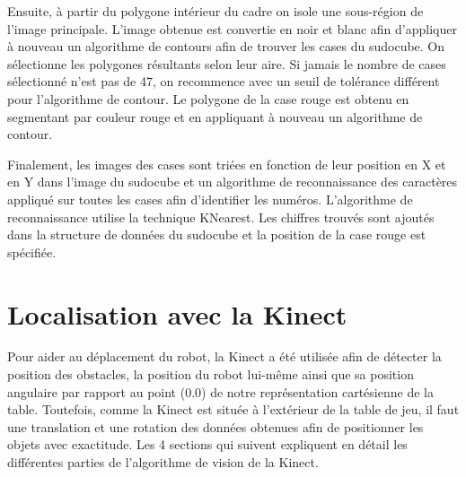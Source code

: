 Ensuite, à partir du polygone intérieur du cadre on isole une sous-région de l'image principale. L'image obtenue est convertie en noir et blanc afin d'appliquer à nouveau un algorithme de contours afin de trouver les cases du sudocube. On sélectionne les polygones résultants selon leur aire. Si jamais le nombre de cases sélectionné n'est pas de 47, on recommence avec un seuil de tolérance différent pour l'algorithme de contour. Le polygone de la case rouge est obtenu en segmentant par couleur rouge et en appliquant à nouveau un algorithme de contour. 

Finalement, les images des cases sont triées en fonction de leur position en X et en Y dans l'image du sudocube et un algorithme de reconnaissance des caractères appliqué sur toutes les cases afin d'identifier les numéros. L'algorithme de reconnaissance utilise la technique KNearest. Les chiffres trouvés sont ajoutés dans la structure de données du sudocube et la position de la case rouge est spécifiée.

\section{Localisation avec la Kinect}

Pour aider au déplacement du robot, la Kinect a été utilisée afin de détecter la position des obstacles, la position du robot lui-même ainsi que sa position angulaire par rapport au point (0.0) de notre représentation cartésienne de la table. Toutefois, comme la Kinect est située à l'extérieur de la table de jeu, il faut une translation et une rotation des données obtenues afin de positionner les objets avec exactitude. Les 4 sections qui suivent expliquent en détail les différentes parties de l'algorithme de vision de la Kinect.

